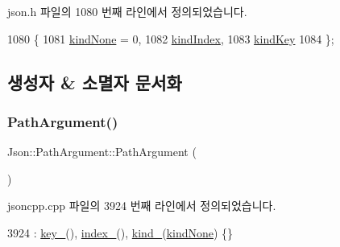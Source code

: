 json.\+h 파일의 1080 번째 라인에서 정의되었습니다.


\begin{DoxyCode}
1080             \{
1081     \hyperlink{class_json_1_1_path_argument_a2420bbad778573c147e578701b84d9b9afa8c7a261ccb8ae5171d2372321c2698}{kindNone} = 0,
1082     \hyperlink{class_json_1_1_path_argument_a2420bbad778573c147e578701b84d9b9ae5a976b898111903334cb131f5e03dc4}{kindIndex},
1083     \hyperlink{class_json_1_1_path_argument_a2420bbad778573c147e578701b84d9b9a74f5968d06c01701b7a46092c33ba7d1}{kindKey}
1084   \};
\end{DoxyCode}


\subsection{생성자 \& 소멸자 문서화}
\mbox{\label{class_json_1_1_path_argument_a3c96ed20c56a55eb76d37a11553c528e}} 
\subsubsection{\texorpdfstring{Path\+Argument()}{PathArgument()}\hspace{0.1cm}{\footnotesize\ttfamily [1/4]}}
{\footnotesize\ttfamily Json\+::\+Path\+Argument\+::\+Path\+Argument (\begin{DoxyParamCaption}{ }\end{DoxyParamCaption})}



jsoncpp.\+cpp 파일의 3924 번째 라인에서 정의되었습니다.


\begin{DoxyCode}
3924 : \hyperlink{class_json_1_1_path_argument_af4024368548ff730ef2bed97d6f1ca43}{key\_}(), \hyperlink{class_json_1_1_path_argument_afd5857d1b6bfaae6961333bdae7bd5ec}{index\_}(), \hyperlink{class_json_1_1_path_argument_ad4bc4b544b155a3d9c7788572ecf991b}{kind\_}(\hyperlink{class_json_1_1_path_argument_a2420bbad778573c147e578701b84d9b9afa8c7a261ccb8ae5171d2372321c2698}{kindNone}) \{\}
\end{DoxyCode}
\mbox{\label{class_json_1_1_path_argument_a53c5b27143b161301b95fd544c139ecf}} 
